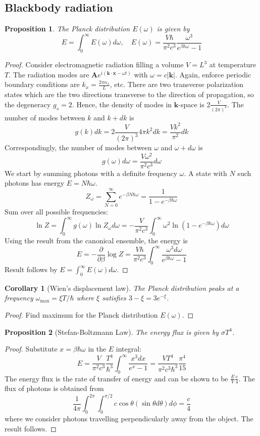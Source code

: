 \documentclass[a4paper]{article}
\theoremstyle{new}
\newtheorem{prop}{Proposition}[section]
\newtheorem{cor}{Corollary}[section]
\begin{document}
\subsection{Blackbody radiation}
\begin{prop}
The Planck distribution $E(\omega)$ is given by
$$E=\int_0^\infty E(\omega)d\omega,\quad E(\omega)=\frac{V\hbar}{\pi^2c^3}\frac{\omega^3}{e^{\beta\hbar\omega}-1}$$
\end{prop}
\begin{proof}
Consider electromagnetic radiation filling a volume $V=L^3$ at temperature $T$. The radiation modes are $\mathbf{A}e^{i(\mathbf{k}\cdot\mathbf{x}-\omega t)}$ with $\omega=c|\mathbf{k}|$. Again, enforce periodic boundary conditions are $k_x=\frac{2\pi n_x}{L}$, etc. There are two transverse polarization states which are the two directions transverse to the direction of propagation, so the degeneracy $g_s=2$. Hence, the density of modes in $\mathbf{k}$-space is $2\frac{V}{(2\pi)^3}$. The number of modes between $k$ and $k+dk$ is 
$$g(k)dk=2\frac{V}{(2\pi)^3}4\pi k^2dk=\frac{Vk^2}{\pi^2}dk$$
Correspondingly, the number of modes between $\omega$ and $\omega+d\omega$ is 
$$g(\omega)d\omega=\frac{V\omega^2}{\pi^2c^3}d\omega$$
We start by summing photons with a definite frequency $\omega$. A state with $N$ such photons has energy $E=N\hbar\omega$.
$$Z_\omega=\sum_{N=0}^\infty e^{-\beta N\hbar\omega}=\frac{1}{1-e^{-\beta\hbar\omega}}$$
Sum over all possible frequencies:
$$\ln Z=\int_0^\infty g(\omega)\ln Z_\omega d\omega=-\frac{V}{\pi^2c^3}\int_0^\infty\omega^2\ln(1-e^{-\beta\hbar\omega})d\omega$$
Using the result from the canonical ensemble, the energy is
$$E=-\frac{\partial}{\partial\beta}\log Z=\frac{V\hbar}{\pi^2c^3}\int_0^\infty\frac{\omega^3d\omega}{e^{\beta\hbar\omega}-1}$$
Result follows by $E=\int_0^\infty E(\omega)d\omega$.
\end{proof}
\begin{cor}[Wien's displacement law]
The Planck distribution peaks at a frequency $\omega_{\text{max}}=\xi T/\hbar$ where $\xi$ satisfies $3-\xi=3e^{-\xi}$.
\end{cor}
\begin{proof}
Find maximum for the Planck distribution $E(\omega)$.
\end{proof}
\begin{prop}[Stefan-Boltzmann Law]
The energy flux is given by $\sigma T^4$.
\end{prop}
\begin{proof}
Substitute $x=\beta\hbar\omega$ in the $E$ integral:
$$E=\frac{V}{\pi^2c^3}\frac{T^4}{\hbar^3}\int_0^\infty\frac{x^3dx}{e^x-1}=\frac{VT^4}{\pi^2c^3\hbar^3}\frac{\pi^4}{15}$$
The energy flux is the rate of transfer of energy and can be shown to be $\frac{E}{V}\frac{c}{4}$. The flux of photons is obtained from
$$\frac{1}{4\pi}\int_0^{2\pi}\int_0^{\pi/2}c\cos\theta (\sin\theta d\theta) d\phi=\frac{c}{4}$$
where we consider photons travelling perpendicularly away from the object. The result follows.
\end{proof}
\end{document}
